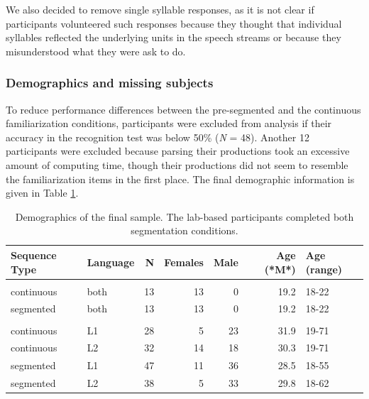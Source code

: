 \documentclass[
]{article}
\begin{document}
We also decided to remove single syllable responses, as it is not clear
if participants volunteered such responses because they thought that
individual syllables reflected the underlying units in the speech
streams or because they misunderstood what they were ask to do.

\subsubsection{Demographics and missing
subjects}\label{demographics-and-missing-subjects}

To reduce performance differences between the pre-segmented and the
continuous familiarization conditions, participants were excluded from
analysis if their accuracy in the recognition test was below 50\%
(\emph{N} = 48). Another 12 participants were excluded because parsing
their productions took an excessive amount of computing time, though
their productions did not seem to resemble the familiarization items in
the first place. The final demographic information is given in Table
\ref{tab:recall-final-demographics-print}.

\begin{longtable}[t]{llrrrrl}
\caption{\label{tab:recall-final-demographics-print}Demographics of the final sample. The lab-based participants completed both segmentation conditions.}\\
\toprule
Sequence Type & Language & N & Females & Male & Age (*M*) & Age (range)\\
\midrule
\addlinespace[0.3em]
\multicolumn{7}{l}{\textbf{Lab-based}}\\
\hspace{1em}continuous & both & 13 & 13 & 0 & 19.2 & 18-22\\
\hspace{1em}segmented & both & 13 & 13 & 0 & 19.2 & 18-22\\
\addlinespace[0.3em]
\multicolumn{7}{l}{\textbf{Online}}\\
\hspace{1em}continuous & L1 & 28 & 5 & 23 & 31.9 & 19-71\\
\hspace{1em}continuous & L2 & 32 & 14 & 18 & 30.3 & 19-71\\
\hspace{1em}segmented & L1 & 47 & 11 & 36 & 28.5 & 18-55\\
\hspace{1em}segmented & L2 & 38 & 5 & 33 & 29.8 & 18-62\\
\bottomrule
\end{longtable}
\end{document}
